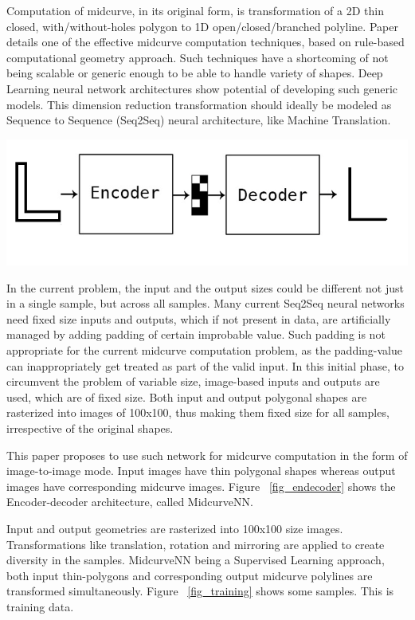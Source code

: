 \documentclass[9pt,academicons]{article}
\begin{document}
		
Computation of midcurve, in its original form, is transformation of a 2D thin closed, with/without-holes polygon to 1D open/closed/branched polyline. Paper \cite{dimred2017} details one of the effective midcurve computation techniques, based on rule-based computational geometry approach. Such techniques have a shortcoming of not being scalable or generic enough to be able to handle variety of shapes. Deep Learning neural network architectures show potential of developing such generic models. This dimension reduction transformation should ideally be modeled as Sequence to Sequence (Seq2Seq) neural architecture, like Machine Translation. 

     \begin{center}
	\includegraphics[width=0.8\linewidth]{images/midcurve_encoder_decoder}
	\label{fig_endecoder}
    \end{center}
    
    
In the current problem, the input and the output sizes could be different not just in a single sample, but across all samples. Many current Seq2Seq neural networks need fixed size inputs and outputs, which if not present in data, are artificially managed by adding padding of certain improbable value. Such padding is not appropriate for the current midcurve computation problem, as the padding-value can inappropriately get treated as part of the valid input. In this initial phase, to circumvent the problem of variable size, image-based inputs and outputs are used, which are of fixed size. Both input and output polygonal shapes are rasterized into images of 100x100, thus making them fixed size for all samples, irrespective of the original shapes.

This paper proposes to use such network for midcurve computation in the form of image-to-image mode. Input images have thin polygonal shapes whereas output images have corresponding midcurve images. Figure ~\ref{fig_endecoder} shows the Encoder-decoder architecture, called MidcurveNN.


    
Input and output geometries are rasterized into 100x100 size images. Transformations like translation, rotation and mirroring are applied to create diversity in the samples. MidcurveNN being a Supervised Learning approach, both input thin-polygons and corresponding output midcurve polylines are transformed simultaneously. Figure ~\ref{fig_training} shows some samples. This is training data.    
\end{document}
